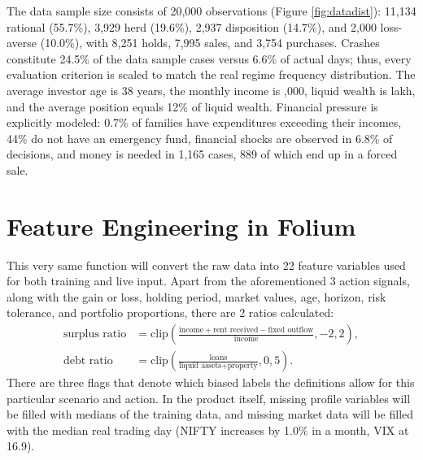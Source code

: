 The data sample size consists of 20,000 observations (Figure \ref{fig:datadist}): 11,134 rational (55.7\%), 3,929 herd (19.6\%), 2,937 disposition (14.7\%), and 2,000 loss-averse (10.0\%), with 8,251 holds, 7,995 sales, and 3,754 purchases. Crashes constitute 24.5\% of the data sample cases versus 6.6\% of actual days; thus, every evaluation criterion is scaled to match the real regime frequency distribution. The average investor age is 38 years, the monthly income is ,000, liquid wealth is  lakh, and the average position equals 12\% of liquid wealth. Financial pressure is explicitly modeled: 0.7\% of families have expenditures exceeding their incomes, 44\% do not have an emergency fund, financial shocks are observed in 6.8\% of decisions, and money is needed in 1,165 cases, 889 of which end up in a forced sale.

\section{Feature Engineering in Folium}
This very same function will convert the raw data into 22 feature variables used for both training and live input. Apart from the aforementioned 3 action signals, along with the gain or loss, holding period, market values, age, horizon, risk tolerance, and portfolio proportions, there are 2 ratios calculated:
\begin{align}
\text{surplus ratio} &= \mathrm{clip}\!\left(\frac{\text{income} + \text{rent received} - \text{fixed outflow}}{\text{income}}, -2, 2\right),\\
\text{debt ratio} &= \mathrm{clip}\!\left(\frac{\text{loans}}{\text{liquid assets} + \text{property}}, 0, 5\right).
\end{align}
There are three flags that denote which biased labels the definitions allow for this particular scenario and action. In the product itself, missing profile variables will be filled with medians of the training data, and missing market data will be filled with the median real trading day (NIFTY increases by 1.0\% in a month, VIX at 16.9).

